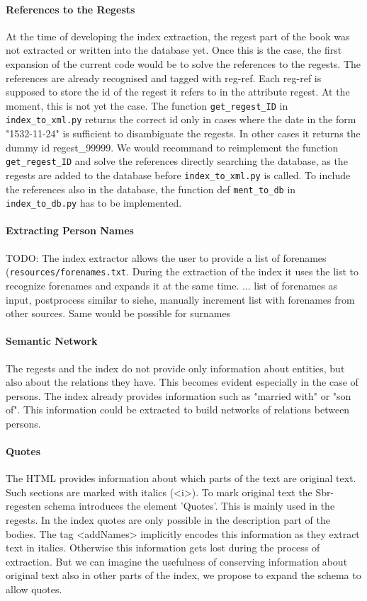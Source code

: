 \paragraph{References to the Regests}
At the time of developing the index extraction, the regest part of the book was not extracted or written into the database yet. Once this is the case, the first expansion of the current code would be to solve the references to the regests. The references are already recognised and tagged with reg-ref. Each reg-ref is supposed to store the id of the regest it refers to in the attribute regest. At the moment, this is not yet the case. The function \texttt{get\_regest\_ID} in \texttt{index\_to\_xml.py} returns the correct id only in cases where the date in the form "1532-11-24" is sufficient to disambiguate the regests. In other cases it returns the dummy id regest\_99999. We would recommand to reimplement the function \texttt{get\_regest\_ID} and solve the references directly searching the database, as the regests are added to the database before \texttt{index\_to\_xml.py} is called. To include the references also in the database, the function def \texttt{ment\_to\_db} in \texttt{index\_to\_db.py} has to be implemented.

\paragraph{Extracting Person Names}
TODO: The index extractor allows the user to provide a list of forenames (\texttt{resources/forenames.txt}. During the extraction of the index it uses the list to recognize forenames and expands it at the same time. ...
list of forenames as input, postprocess similar to siehe, manually increment list with forenames from other sources. Same would be possible for surnames

\paragraph{Semantic Network}
The regests and the index do not provide only information about entities, but also about the relations they have. This becomes evident especially in the case of persons. The index already provides information such as "married with" or "son of". This information could be extracted to build networks of relations between persons.

\paragraph{Quotes}
The HTML provides information about which parts of the text are original text. Such sections are marked with italics (<i>). To mark original text the Sbr-regesten schema introduces the element 'Quotes'. This is mainly used in the regests. In the index quotes are only possible in the description part of the bodies. The tag <addNames> implicitly encodes this information as they extract text in italics. Otherwise this information gets lost during the process of extraction. But we can imagine the usefulness of conserving information about original text also in other parts of the index, we propose to expand the schema to allow quotes.


